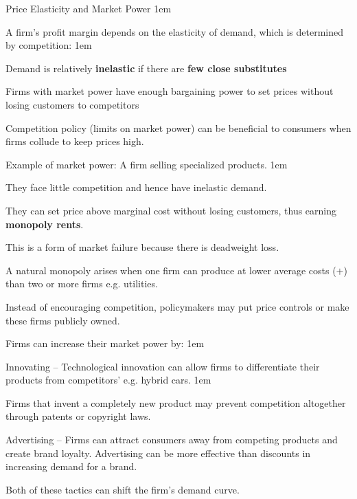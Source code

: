 \documentclass[11pt,aspectratio=43,usenames,dvipsnames]{beamer}
\let\olditemize=\itemize
\let\endolditemize=\enditemize
\renewenvironment{itemize}{\olditemize \itemsep1em}{\endolditemize}
\let\oldenumerate=\enumerate
\let\endoldenumerate=\endenumerate
\renewenvironment{enumerate}{\oldenumerate \itemsep1em}{ \endoldenumerate}
\theoremstyle{definition}
\begin{document}
\begin{frame}[allowframebreaks]{Price Elasticity and Market Power}
\label{slide:Price_Elasticity_and_Market_Power}
\begin{itemize}
    \item A firm’s profit margin depends on the \alert{elasticity of demand}, which is determined by competition:
    \begin{itemize}
        \item Demand is relatively \textbf{inelastic} if there are \textbf{few close substitutes}
        \item Firms with market power have enough bargaining power to \alert{set prices} without losing customers to competitors
    \end{itemize}
    \item Competition policy (limits on market power) can be beneficial to consumers when firms collude to keep prices high.
    \framebreak
    \item Example of market power: A firm selling \alert{specialized} products.
    \begin{itemize}
        \item They face \alert{little competition} and hence have \alert{inelastic demand}.
        \item They can set price above marginal cost without losing customers, thus earning \textbf{monopoly rents}.
        \item This is a form of market failure because there is deadweight loss.
    \end{itemize}
    \item A natural monopoly arises when one firm can \alert{produce at lower average costs} ($+$) than two or more firms e.g. utilities.
    \item Instead of encouraging competition, policymakers may put price controls or make these firms publicly owned.
    \framebreak
    \item Firms can increase their market power by:
    \begin{enumerate}
        \item Innovating – Technological innovation can allow firms to differentiate their products from competitors’ e.g. hybrid cars.
        \begin{itemize}
            \item Firms that invent a completely new product may prevent competition altogether through patents or copyright laws.
        \end{itemize}

        \item Advertising – Firms can attract consumers away from competing products and create brand loyalty. Advertising can be more effective than discounts in increasing demand for a brand.
    \end{enumerate}
    \item Both of these tactics can shift the firm’s demand curve.
\end{itemize}
\end{frame}
\end{document}
